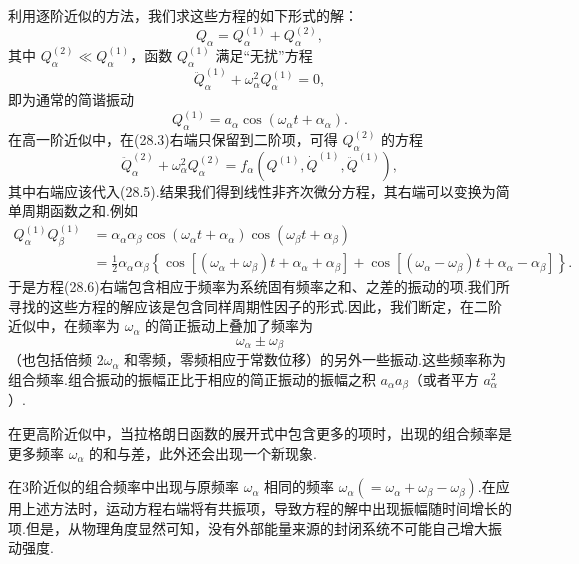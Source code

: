 利用逐阶近似的方法，我们求这些方程的如下形式的解：
\begin{equation}
  Q_\alpha=Q_\alpha^{(1)}+Q_\alpha^{(2)},
\end{equation}
其中 $Q_\alpha^{(2)}\ll Q_\alpha^{(1)}$，函数 $Q_\alpha^{(1)}$ 满足“无扰”方程
\begin{equation*}
  \ddot{Q}_\alpha^{(1)}+\omega_\alpha^2Q_\alpha^{(1)}=0,
\end{equation*}
即为通常的简谐振动
\begin{equation}
  Q_\alpha^{(1)}=a_\alpha\cos(\omega_\alpha t+\alpha_\alpha).
\end{equation}
在高一阶近似中，在(28.3)右端只保留到二阶项，可得 $Q_\alpha^{(2)}$ 的方程
\begin{equation}
  \ddot{Q}_\alpha^{(2)}+\omega_\alpha^2Q_\alpha^{(2)}
  =f_\alpha\left(Q^{(1)},\dot{Q}^{(1)},\ddot{Q}^{(1)}\right),
\end{equation}
其中右端应该代入(28.5).结果我们得到线性非齐次微分方程，其右端可以变换为简单周期函数之和.例如
\begin{equation*}
\begin{aligned}
  Q_\alpha^{(1)}Q_\beta^{(1)}
  &={}\alpha_\alpha\alpha_\beta\cos\left(\omega_\alpha t+\alpha_\alpha\right)
  \cos\left(\omega_\beta t+\alpha_\beta\right)\\
  &={}\frac{1}{2}\alpha_\alpha\alpha_\beta
  \left\{\cos\left[\left(\omega_\alpha+\omega_\beta\right)t+\alpha_\alpha+\alpha_\beta\right]
  +\cos\left[\left(\omega_\alpha-\omega_\beta\right)t+\alpha_\alpha-\alpha_\beta\right]\right\}.
\end{aligned}
\end{equation*}
于是方程(28.6)右端包含相应于频率为系统固有频率之和、之差的振动的项.我们所寻找的这些方程的解应该是包含同样周期性因子的形式.因此，我们断定，在二阶近似中，在频率为 $\omega_\alpha$ 的简正振动上叠加了频率为
\begin{equation}
  \omega_\alpha\pm\omega_\beta
\end{equation}
（也包括倍频 $2\omega_\alpha$ 和零频，零频相应于常数位移）的另外一些振动.这些频率称为组合频率.组合振动的振幅正比于相应的简正振动的振幅之积 $a_\alpha a_\beta$（或者平方 $a_\alpha^2$）.

在更高阶近似中，当拉格朗日函数的展开式中包含更多的项时，出现的组合频率是更多频率 $\omega_\alpha$ 的和与差，此外还会出现一个新现象.

在3阶近似的组合频率中出现与原频率 $\omega_\alpha$ 相同的频率
$\omega_\alpha\left(=\omega_\alpha+\omega_\beta-\omega_\beta\right)$.在应用上述方法时，运动方程右端将有共振项，导致方程的解中出现振幅随时间增长的项.但是，从物理角度显然可知，没有外部能量来源的封闭系统不可能自己增大振动强度.

